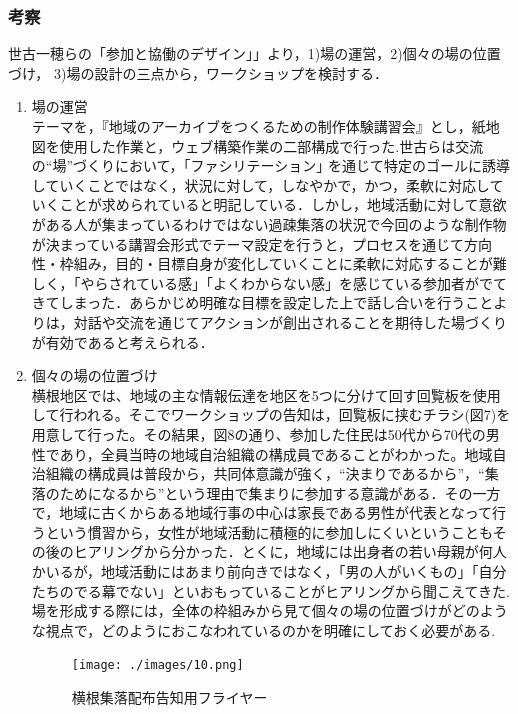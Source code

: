 \documentclass[a4paper]{jsarticle}
\begin{document}
\subsubsection{考察}
世古一穂らの「参加と協働のデザイン」」\cite{13}より，1)場の運営，2)個々の場の位置づけ， 3)場の設計の三点から，ワークショップを検討する．\\
\begin{enumerate}
\item 場の運営\\
テーマを，『地域のアーカイブをつくるための制作体験講習会』とし，紙地図を使用した作業と，ウェブ構築作業の二部構成で行った.世古ら\cite{13}は交流の“場”づくりにおいて，｢ファシリテーション｣ を通じて特定のゴールに誘導していくことではなく，状況に対して，しなやかで，かつ，柔軟に対応していくことが求められていると明記している．しかし，地域活動に対して意欲がある人が集まっているわけではない過疎集落の状況で今回のような制作物が決まっている講習会形式でテーマ設定を行うと，プロセスを通じて方向性・枠組み，目的・目標自身が変化していくことに柔軟に対応することが難しく，「やらされている感」「よくわからない感」を感じている参加者がでてきてしまった．あらかじめ明確な目標を設定した上で話し合いを行うことよりは，対話や交流を通じてアクションが創出されることを期待した場づくりが有効であると考えられる．\\
\item  個々の場の位置づけ\\
横根地区では、地域の主な情報伝達を地区を5つに分けて回す回覧板を使用して行われる。そこでワークショップの告知は，回覧板に挟むチラシ(図7)を用意して行った。その結果，図8の通り、参加した住民は50代から70代の男性であり，全員当時の地域自治組織の構成員であることがわかった。地域自治組織の構成員は普段から，共同体意識が強く，“決まりであるから”，“集落のためになるから”という理由で集まりに参加する意識がある．その一方で，地域に古くからある地域行事の中心は家長である男性が代表となって行うという慣習から，女性が地域活動に積極的に参加しにくいということもその後のヒアリングから分かった．とくに，地域には出身者の若い母親が何人かいるが，地域活動にはあまり前向きではなく，「男の人がいくもの」「自分たちのでる幕でない」といおもっていることがヒアリングから聞こえてきた.場を形成する際には，全体の枠組みから見て個々の場の位置づけがどのような視点で，どのようにおこなわれているのかを明確にしておく必要がある.\\
\begin{figure}[H]
  \begin{center}
    \texttt{[image: ./images/10.png]}
    \caption{横根集落配布告知用フライヤー}
    \label{fig:tmu_hino}
  \end{center}

\end{figure}
\end{enumerate}
\end{document}
